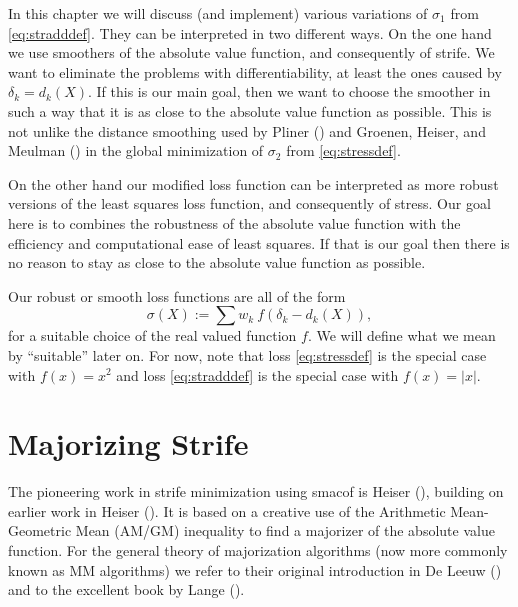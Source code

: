 \documentclass[
  12pt,
  letterpaper,
  DIV=11,
  numbers=noendperiod]{scrartcl}
\newcommand{\sectionbreak}{\pagebreak}
\begin{document}
In this chapter we will discuss (and implement) various variations of
\(\sigma_1\) from \eqref{eq:stradddef}. They can be interpreted in two
different ways. On the one hand we use smoothers of the absolute value
function, and consequently of strife. We want to eliminate the problems
with differentiability, at least the ones caused by \(\delta_k=d_k(X)\).
If this is our main goal, then we want to choose the smoother in such a
way that it is as close to the absolute value function as possible. This
is not unlike the distance smoothing used by Pliner
() and Groenen, Heiser, and Meulman
() in the global
minimization of \(\sigma_2\) from \eqref{eq:stressdef}.

On the other hand our modified loss function can be interpreted as more
robust versions of the least squares loss function, and consequently of
stress. Our goal here is to combines the robustness of the absolute
value function with the efficiency and computational ease of least
squares. If that is our goal then there is no reason to stay as close to
the absolute value function as possible.

Our robust or smooth loss functions are all of the form \begin{equation}
\sigma(X):=\sum w_k\ f(\delta_k-d_k(X))\label{eq:strifedef},
\end{equation} for a suitable choice of the real valued function \(f\).
We will define what we mean by ``suitable'' later on. For now, note that
loss \eqref{eq:stressdef} is the special case with \(f(x)=x^2\) and loss
\eqref{eq:stradddef} is the special case with \(f(x)=|x|\).

\sectionbreak

\section{Majorizing Strife}\label{majorizing-strife}

The pioneering work in strife minimization using smacof is Heiser
(), building on earlier work in Heiser
(). It is based on a creative use of the
Arithmetic Mean-Geometric Mean (AM/GM) inequality to find a majorizer of
the absolute value function. For the general theory of majorization
algorithms (now more commonly known as MM algorithms) we refer to their
original introduction in De Leeuw ()
and to the excellent book by Lange ().
\end{document}
